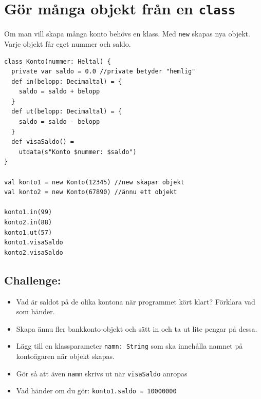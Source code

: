 \chapter{Gör många objekt från en \lstinline{class}}
\begin{multicols}{2}
Om man vill skapa många konto behövs en klass. Med \lstinline{new} skapas nya objekt. Varje objekt får eget nummer och saldo.

\begin{lstlisting}[basicstyle={\ttfamily\fontsize{13}{16}\selectfont},numbers=none]
class Konto(nummer: Heltal) {
  private var saldo = 0.0 //private betyder "hemlig"  
  def in(belopp: Decimaltal) = {
    saldo = saldo + belopp
  }
  def ut(belopp: Decimaltal) = {
    saldo = saldo - belopp
  }
  def visaSaldo() = 
    utdata(s"Konto $nummer: $saldo")
}

val konto1 = new Konto(12345) //new skapar objekt 
val konto2 = new Konto(67890) //ännu ett objekt

konto1.in(99)
konto2.in(88)
konto1.ut(57)
konto1.visaSaldo
konto2.visaSaldo
\end{lstlisting}
        


\columnbreak


\section*{\color{BrickRed}Challenge:}


\begin{itemize}

\item {Vad är saldot på de olika kontona när programmet kört klart? Förklara vad som händer.}
\item {Skapa ännu fler bankkonto-objekt och sätt in och ta ut lite pengar på dessa.}
\item {Lägg till en klassparameter \lstinline{namn: String} som ska innehålla namnet på kontoägaren när objekt skapas.}
\item {Gör så att även \lstinline{namn} skrivs ut när \lstinline{visaSaldo} anropas}
\item {Vad händer om du gör: \lstinline{konto1.saldo = 10000000 }}

\end{itemize}


\end{multicols}

